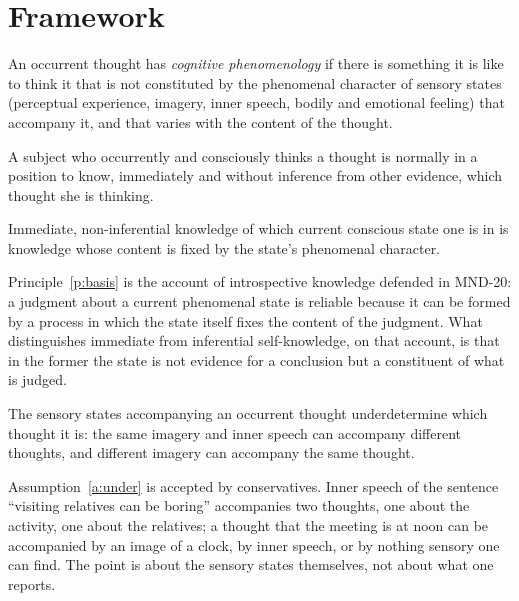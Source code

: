\documentclass{situationist-preprint}
\begin{document}
\section{Framework}

\begin{definition}\label{d:cp}
An occurrent thought has \emph{cognitive phenomenology} if there is something it is like to think it that is not constituted by the phenomenal character of sensory states (perceptual experience, imagery, inner speech, bodily and emotional feeling) that accompany it, and that varies with the content of the thought.
\end{definition}

\begin{principle}\label{p:know}
A subject who occurrently and consciously thinks a thought is normally in a position to know, immediately and without inference from other evidence, which thought she is thinking.
\end{principle}

\begin{principle}\label{p:basis}
Immediate, non-inferential knowledge of which current conscious state one is in is knowledge whose content is fixed by the state's phenomenal character.
\end{principle}

Principle~\ref{p:basis} is the account of introspective knowledge defended in MND-20: a judgment about a current phenomenal state is reliable because it can be formed by a process in which the state itself fixes the content of the judgment. What distinguishes immediate from inferential self-knowledge, on that account, is that in the former the state is not evidence for a conclusion but a constituent of what is judged.

\begin{assumption}[Underdetermination]\label{a:under}
The sensory states accompanying an occurrent thought underdetermine which thought it is: the same imagery and inner speech can accompany different thoughts, and different imagery can accompany the same thought.
\end{assumption}

Assumption~\ref{a:under} is accepted by conservatives. Inner speech of the sentence \enquote{visiting relatives can be boring} accompanies two thoughts, one about the activity, one about the relatives; a thought that the meeting is at noon can be accompanied by an image of a clock, by inner speech, or by nothing sensory one can find. The point is about the sensory states themselves, not about what one reports.
\end{document}
